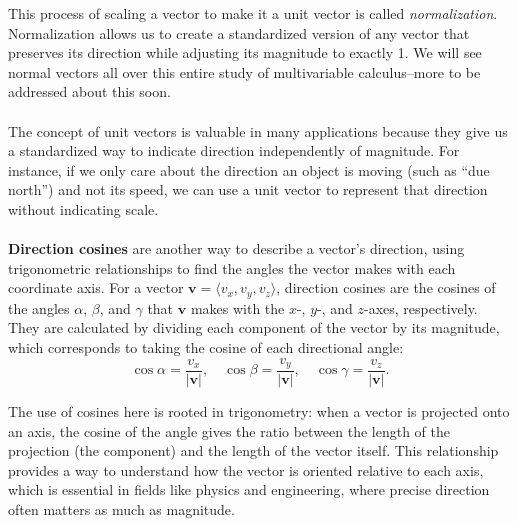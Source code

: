 \noindent This process of scaling a vector to make it a unit vector is called \textit{normalization}. Normalization allows us to create a standardized version of any vector that preserves its direction while adjusting its magnitude to exactly 1. We will see normal vectors all over this entire study of multivariable calculus--more to be addressed about this soon. \\ \\ The concept of unit vectors is valuable in many applications because they give us a standardized way to indicate direction independently of magnitude. For instance, if we only care about the direction an object is moving (such as ``due north”) and not its speed, we can use a unit vector to represent that direction without indicating scale. \\ \\ \textbf{Direction cosines}  are another way to describe a vector’s direction, using trigonometric relationships to find the angles the vector makes with each coordinate axis. For a vector \( \mathbf{v} = \langle v_x, v_y, v_z \rangle \), direction cosines are the cosines of the angles \( \alpha \), \( \beta \), and \( \gamma \) that \( \mathbf{v} \) makes with the \( x \)-, \( y \)-, and \( z \)-axes, respectively. They are calculated by dividing each component of the vector by its magnitude, which corresponds to taking the cosine of each directional angle:
\[
\cos \alpha = \frac{v_x}{|\mathbf{v}|}, \quad \cos \beta = \frac{v_y}{|\mathbf{v}|}, \quad \cos \gamma = \frac{v_z}{|\mathbf{v}|}.
\]

\noindent The use of cosines here is rooted in trigonometry: when a vector is projected onto an axis, the cosine of the angle gives the ratio between the length of the projection (the component) and the length of the vector itself. This relationship provides a way to understand how the vector is oriented relative to each axis, which is essential in fields like physics and engineering, where precise direction often matters as much as magnitude.


